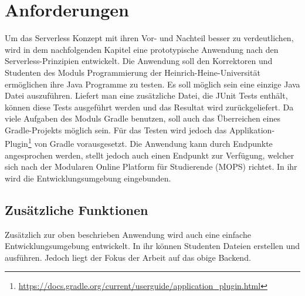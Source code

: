 \chapter{Anforderungen}
Um das Serverless Konzept mit ihren Vor- und Nachteil
besser zu verdeutlichen, wird in dem nachfolgenden Kapitel
eine prototypische Anwendung nach den Serverless-Prinzipien
entwickelt. Die Anwendung soll den Korrektoren und Studenten
des Moduls Programmierung der Heinrich-Heine-Universität
ermöglichen ihre Java Programme zu testen.
Es soll möglich sein eine einzige Java Datei auszuführen.
Liefert man eine zusätzliche Datei, die JUnit Tests enthält,
können diese Tests ausgeführt werden und das Resultat wird
zurückgeliefert. Da viele Aufgaben des Moduls
Gradle benutzen, soll auch das Überreichen eines Gradle-Projekts möglich sein.
Für das Testen wird jedoch
das Applikation-Plugin\footnote{\url{https://docs.gradle.org/current/userguide/application_plugin.html}}
von Gradle vorausgesetzt.
Die Anwendung kann durch Endpunkte angesprochen werden,
stellt jedoch auch einen Endpunkt zur Verfügung, welcher sich nach
der Modularen Online Platform für Studierende (MOPS) richtet.
In ihr wird die Entwicklungsumgebung eingebunden.

\section{Zusätzliche Funktionen}
Zusätzlich zur oben beschrieben Anwendung
wird auch eine einfache Entwicklungsumgebung entwickelt.
In ihr können Studenten Dateien erstellen und ausführen.
Jedoch liegt der Fokus der Arbeit auf das obige Backend.